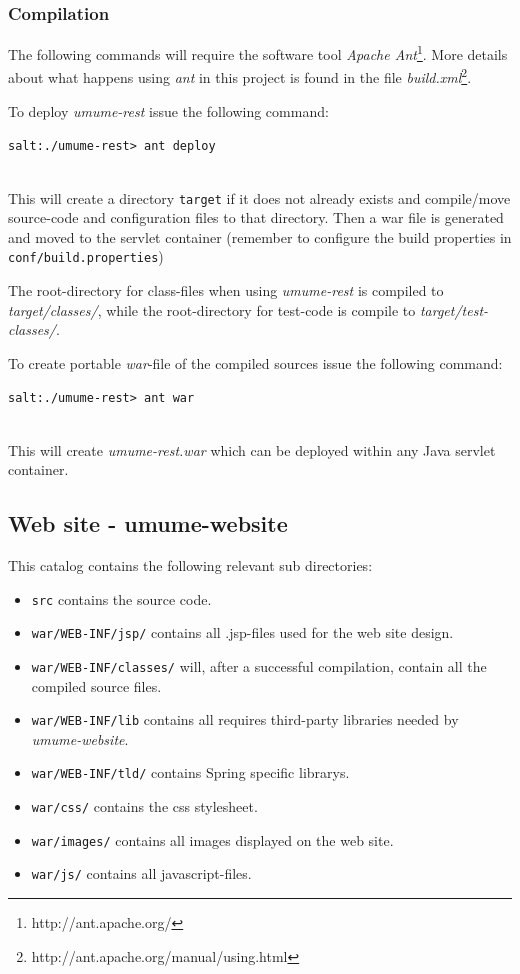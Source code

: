 \documentclass[titlepage, twocolumn, a4paper, 10pt]{article}
\begin{document}
\subsubsection{Compilation}\label{sec:compilation-rest}
The following commands will require the software tool \textit{Apache
  Ant}\footnote{http://ant.apache.org/}. More details about what
happens using \textit{ant} in this project is found in the file
\textit{build.xml}\footnote{http://ant.apache.org/manual/using.html}.

To deploy \textit{umume-rest} issue the following command:\\
\begin{footnotesize}
  \verb!salt:./umume-rest> ant deploy!
\end{footnotesize}\\
This will create a directory \verb!target! if it does not already exists
and compile/move source-code and configuration files to that
directory. Then a war file is generated and moved to the servlet 
container (remember to configure the build properties in 
\verb!conf/build.properties!)

The root-directory for class-files when using \textit{umume-rest} is
compiled to \textit{target/classes/}, while the root-directory for
test-code is compile to \textit{target/test-classes/}.

To create portable \textit{war}-file of the compiled sources issue the
following command:\\
\begin{footnotesize}
  \verb!salt:./umume-rest> ant war!
\end{footnotesize}\\
This will create \textit{umume-rest.war} which can be deployed within
any Java servlet container.


\subsection{Web site - umume-website}

This catalog contains the following relevant sub directories:
\begin{itemize}
\item \verb!src! contains the source code.
\item \verb!war/WEB-INF/jsp/! contains all .jsp-files used for the web site design.
\item \verb!war/WEB-INF/classes/! will, after a successful compilation,
  contain all the compiled source files.
\item \verb!war/WEB-INF/lib! contains all requires third-party libraries
  needed by \textit{umume-website}.
\item \verb!war/WEB-INF/tld/! contains Spring specific librarys.
\item \verb!war/css/! contains the css stylesheet.
\item \verb!war/images/! contains all images displayed on the web site.
\item \verb!war/js/! contains all javascript-files.
\end{itemize}
\end{document}
